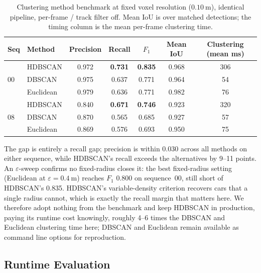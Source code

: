 \begin{table}[H]
  \centering
  \caption[Clustering method benchmark]{Clustering method benchmark at fixed voxel resolution
    ($\SI{0.10}{\metre}$), identical pipeline, per-frame / track filter off. Mean IoU is over
    matched detections; the timing column is the mean per-frame clustering time.}
  \label{tab:clustering}
  \begin{tabular}{llccccc}
    \toprule
    Seq & Method & Precision & Recall & $F_1$ & Mean IoU & Clustering (mean ms) \\
    \midrule
    \multirow{3}{*}{00}
      & HDBSCAN   & 0.972 & \textbf{0.731} & \textbf{0.835} & 0.968 & 306 \\
      & DBSCAN    & 0.975 & 0.637 & 0.771 & 0.964 & 54 \\
      & Euclidean & 0.979 & 0.636 & 0.771 & 0.982 & 76 \\
    \midrule
    \multirow{3}{*}{08}
      & HDBSCAN   & 0.840 & \textbf{0.671} & \textbf{0.746} & 0.923 & 320 \\
      & DBSCAN    & 0.870 & 0.565 & 0.685 & 0.927 & 57 \\
      & Euclidean & 0.869 & 0.576 & 0.693 & 0.950 & 75 \\
    \bottomrule
  \end{tabular}
\end{table}

The gap is entirely a recall gap; precision is within \num{0.030} across all
methods on either sequence, while HDBSCAN's recall exceeds the alternatives by
\numrange{9}{11} points. An $\varepsilon$-sweep confirms no fixed-radius closes
it: the best fixed-radius setting (Euclidean at $\varepsilon=\SI{0.4}{\metre}$)
reaches $F_1$ \num{0.800} on sequence~00, still short of HDBSCAN's \num{0.835}.
HDBSCAN's variable-density criterion recovers cars that a single radius cannot,
which is exactly the recall margin that matters here. We therefore
adopt nothing from the benchmark and keep HDBSCAN in production, paying
its runtime cost knowingly, roughly \numrange{4}{6} times the DBSCAN and Euclidean clustering
time here; DBSCAN and Euclidean remain available as command line options for reproduction.

\subsection{Runtime Evaluation}
\label{sec:results-runtime}

